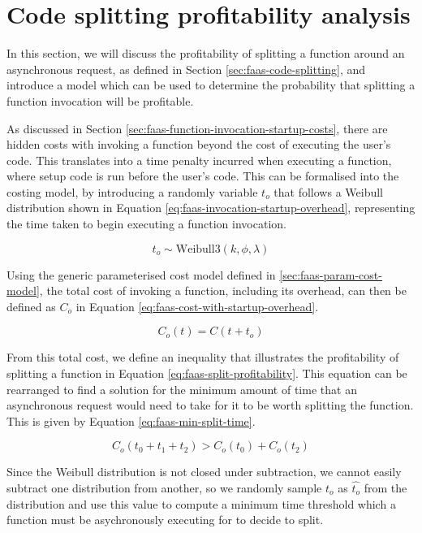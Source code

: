 \section{Code splitting profitability analysis}
\label{sec:faas-code-splitting-profitability}
In this section, we will discuss the profitability of splitting a function around an asynchronous request, as defined in Section \ref{sec:faas-code-splitting}, and introduce a model which can be used to determine the probability that splitting a function invocation will be profitable.

As discussed in Section \ref{sec:faas-function-invocation-startup-costs}, there are hidden costs with invoking a function beyond the cost of executing the user's code. This translates into a time penalty incurred when executing a function, where setup code is run before the user's code. This can be formalised into the costing model, by introducing a randomly variable $t_o$ that follows a Weibull distribution shown in Equation \ref{eq:faas-invocation-startup-overhead}, representing the time taken to begin executing a function invocation.

\begin{equation}
\label{eq:faas-invocation-startup-overhead}
t_o \sim \text{Weibull3}(k, \phi, \lambda)
\end{equation}

Using the generic parameterised cost model defined in \ref{sec:faas-param-cost-model}, the total cost of invoking a function, including its overhead, can then be defined as $C_o$ in Equation \ref{eq:faas-cost-with-startup-overhead}.

\begin{equation}
\label{eq:faas-cost-with-startup-overhead}
C_o(t) = C(t + t_o)
\end{equation}

From this total cost, we define an inequality that illustrates the profitability of splitting a function in Equation \ref{eq:faas-split-profitability}. This equation can be rearranged to find a solution for the minimum amount of time that an asynchronous request would need to take for it to be worth splitting the function. This is given by Equation \ref{eq:faas-min-split-time}.

\begin{equation} \label{eq:faas-split-profitability}
C_o(t_0 + t_1 + t_2) > C_o(t_0) + C_o(t_2)
\end{equation}

Since the Weibull distribution is not closed under subtraction, we cannot easily subtract one distribution from another, so we randomly sample $t_o$ as $\hat{t_o}$ from the distribution and use this value to compute a minimum time threshold which a function must be asychronously executing for to decide to split.

